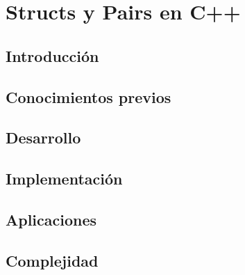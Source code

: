 \chapter{Structs y Pairs en C++}
\section{Introducción}

\section{Conocimientos previos}

\section{Desarrollo}

\section{Implementación}

\section{Aplicaciones}

\section{Complejidad}

%